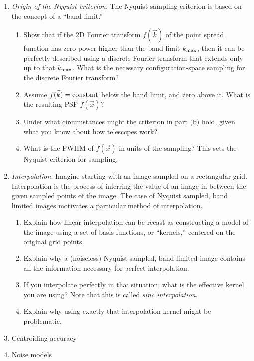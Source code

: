 \begin{enumerate}
\item {\it Origin of the Nyquist criterion}. The Nyquist
    sampling criterion is based on the concept of a ``band
    limit.''
    \begin{enumerate}
    \item Show that if the 2D Fourier
    transform $f(\vec{k})$ of the point spread function has zero power
    higher than the band limit $k_{\rm max}$, then it can be perfectly
    described using a discrete Fourier transform that extends only up
    to that $k_{\rm max}$. What is the necessary configuration-space
    sampling for the discrete Fourier transform?
    \item Assume $f(\vec{k}) = {\rm constant}$
    below the band limit, and zero above it. What is the resulting PSF
    $f(\vec{x})$?
    \item Under what circumstances might the criterion in part (b)
    hold, given what you know about how telescopes work?
    \item What is the FWHM of $f(\vec{x})$ in units of the sampling?
    This sets the Nyquist criterion for sampling.
    \end{enumerate}
\item {\it Interpolation}. Imagine starting with an image sampled on a
    rectangular grid. Interpolation is the process of inferring
    the value of an image in between the given sampled points of the
    image. The case of Nyquist sampled, band limited images motivates
    a particular method of interpolation.
    \begin{enumerate}
    \item Explain how linear interpolation can be recast as
    constructing a model of the image using a set of basis functions,
    or ``kernels,'' centered on the original grid points.
    \item Explain why a (noiseless) Nyquist sampled, band limited
    image contains all the information necessary for perfect
    interpolation.
    \item If you interpolate perfectly in that situation, what is the
    effective kernel you are using? Note that this is called {\it
    sinc interpolation}.
    \item Explain why using exactly that interpolation kernel might be
    problematic.
    \end{enumerate}
\item Centroiding accuracy
\item Noise models
\end{enumerate}


